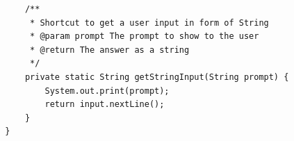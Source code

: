 \documentclass[12pt,titlepage]{article}
\begin{document}
\begin{enumerate}
{\begin{verbatim}
            /**
             * Shortcut to get a user input in form of String
             * @param prompt The prompt to show to the user
             * @return The answer as a string
             */
            private static String getStringInput(String prompt) {
                System.out.print(prompt);
                return input.nextLine();
            }
        }
        \end{verbatim}
    }
\end{enumerate}
\end{document}
